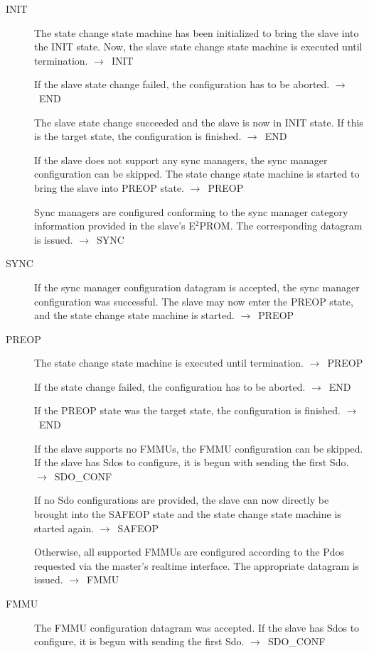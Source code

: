 \documentclass[a4paper,12pt,BCOR6mm,bibtotoc,idxtotoc]{scrbook}
\begin{document}
\begin{description}
\item[INIT] The state change state machine has been initialized to
  bring the slave into the INIT state. Now, the slave state change
  state machine is executed until termination. $\rightarrow$~INIT

  If the slave state change failed, the configuration has to be
  aborted. $\rightarrow$~END

  The slave state change succeeded and the slave is now in INIT state.
  If this is the target state, the configuration is finished.
  $\rightarrow$~END

  If the slave does not support any sync managers, the sync manager
  configuration can be skipped. The state change state machine is
  started to bring the slave into PREOP state.
  $\rightarrow$~PREOP

  Sync managers are configured conforming to the sync manager category
  information provided in the slave's E$^2$PROM. The corresponding
  datagram is issued. $\rightarrow$~SYNC

\item[SYNC] If the sync manager configuration datagram is accepted,
  the sync manager configuration was successful. The slave may now
  enter the PREOP state, and the state change state machine is
  started. $\rightarrow$~PREOP

\item[PREOP] The state change state machine is executed until
  termination. $\rightarrow$~PREOP

  If the state change failed, the configuration has to be aborted.
  $\rightarrow$~END

  If the PREOP state was the target state, the configuration is
  finished. $\rightarrow$~END

  If the slave supports no FMMUs, the FMMU configuration can be
  skipped. If the slave has Sdos to configure, it is begun with
  sending the first Sdo. $\rightarrow$~SDO\_CONF

  If no Sdo configurations are provided, the slave can now directly be
  brought into the SAFEOP state and the state change state machine is
  started again. $\rightarrow$~SAFEOP

  Otherwise, all supported FMMUs are configured according to the Pdos
  requested via the master's realtime interface. The appropriate
  datagram is issued. $\rightarrow$~FMMU

\item[FMMU] The FMMU configuration datagram was accepted. If the slave
  has Sdos to configure, it is begun with sending the first Sdo.
  $\rightarrow$~SDO\_CONF


\end{description}
\end{document}
